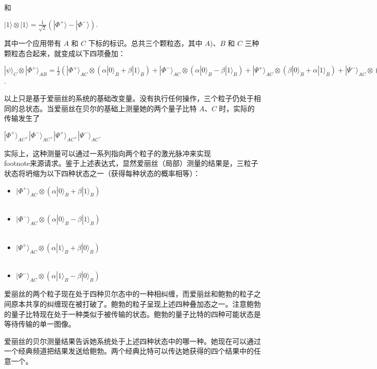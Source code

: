 和

$|1\rangle \otimes |1\rangle = \frac{1}{\sqrt{2}} (| \Phi^{+} \rangle - |\Phi^{-}\rangle).$

其中一个应用带有 $A$ 和 $C$ 下标的标识。总共三个颗粒态，其中 $A$)、$B$ 和 $C$ 三种颗粒态合起来，就变成以下四项叠加：

$|\psi\rangle_{C} \otimes |\Phi^{+}\rangle_{AB} =\frac{1}{2} \left( |\Phi^{+}\rangle_{AC} \otimes (\alpha |0\rangle_{B} + \beta |1\rangle_{B}) + |\Phi^{-}\rangle_{AC} \otimes (\alpha |0\rangle_{B} - \beta |1\rangle_{B}) + |\Psi^{+}\rangle_{AC} \otimes (\beta |0\rangle_{B} + \alpha |1\rangle_{B}) +|\Psi^{-}\rangle_{AC} \otimes (\beta |0\rangle_{B} - \alpha |1\rangle_{B}) \right)$.

以上只是基于爱丽丝的系统的基础改变量。没有执行任何操作，三个粒子仍处于相同的总状态。当爱丽丝在贝尔的基础上测量她的两个量子比特 $A$、$C$ 时，实际的传输发生了

$ |\Phi^{+}\rangle_{AC}, |\Phi^{-}\rangle_{AC}, |\Psi^{+}\rangle_{AC}, |\Psi^{-}\rangle_{AC}. $

实际上，这种测量可以通过一系列指向两个粒子的激光脉冲来实现\\footnote{来源请求}。鉴于上述表达式，显然爱丽丝（局部）测量的结果是，三粒子状态将坍缩为以下四种状态之一（获得每种状态的概率相等）：

\begin{itemize}
\item $|\Phi^+\rangle_{AC} \otimes (\alpha|0\rangle_B + \beta|1\rangle_B)$\\\\
\item $|\Phi^-\rangle_{AC} \otimes (\alpha|0\rangle_B - \beta|1\rangle_B)$\\\\
\item $|\Psi^+\rangle_{AC} \otimes (\alpha|1\rangle_B + \beta|0\rangle_B)$\\\\
\item $|\Psi^-\rangle_{AC} \otimes (\alpha|1\rangle_B - \beta|0\rangle_B)$
\end{itemize}

爱丽丝的两个粒子现在处于四种贝尔态中的一种相纠缠，而爱丽丝和鲍勃的粒子之间原本共享的纠缠现在被打破了。鲍勃的粒子呈现上述四种叠加态之一。注意鲍勃的量子比特现在处于一种类似于被传输的状态。鲍勃的量子比特的四种可能状态是等待传输的单一图像。

爱丽丝的贝尔测量结果告诉她系统处于上述四种状态中的哪一种。她现在可以通过一个经典频道把结果发送给鲍勃。两个经典比特可以传达她获得的四个结果中的任意一个。

